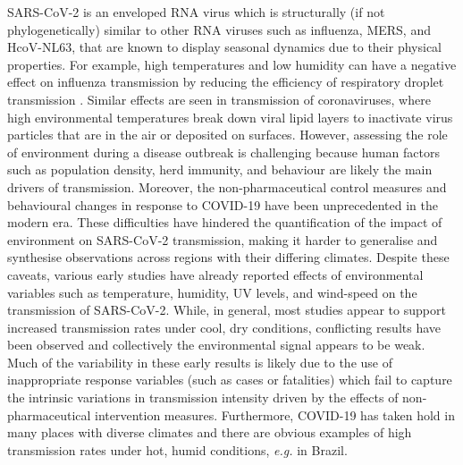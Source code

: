 \documentclass[12pt,english,a4paper]{article}
\newcommand{\virus}{SARS-CoV-2\xspace}
\newcommand{\disease}{COVID-19\xspace}
\begin{document}
\virus is an enveloped RNA virus which is structurally (if not phylogenetically)
similar to other RNA viruses such as influenza, MERS, and HcoV-NL63\cite{Xie2020}, that are known to display seasonal dynamics due to their physical properties. For example, high temperatures and low humidity can have a negative effect on influenza transmission by reducing the efficiency of respiratory droplet transmission \cite{Lowen2007, Lowen2014}. Similar effects are seen in transmission of coronaviruses\cite{Tan2005, Chan2011, VanDoremalen2013}, where high environmental temperatures break down viral lipid layers to inactivate virus particles that are in the air or deposited on surfaces\cite{Chan2011,Schoeman2019}.
However, assessing the role of environment during a disease outbreak is challenging\cite{Carlson2020} because human factors such as population density, herd immunity, and behaviour are likely the main drivers of transmission\cite{Carlson2020a, Korevaar2020, Rocklov2020}. Moreover, the non-pharmaceutical control measures and behavioural changes in response to \disease have been unprecedented in the modern era.
These difficulties have hindered the quantification of the impact of environment on \virus transmission, making it harder to generalise and synthesise observations across regions with their differing climates.
Despite these caveats, various early studies have already reported effects of environmental variables such as temperature, humidity, UV levels, and wind-speed on the transmission of \virus \cite{Araujo2020, Baker2020, Bukhari2020, Chen2020, Luo2020, Ma2020, Merow2020, Sajadi2020}.
While, in general, most studies appear to support increased transmission rates under cool, dry conditions\cite{Baker2020},
conflicting results have been observed\cite{Luo2020, Yao2020} and collectively the environmental signal appears to be weak\cite{Smit2020}. 
Much of the variability in these early results is likely due to the use of inappropriate response variables (such as cases or fatalities) which fail to capture the intrinsic variations in transmission intensity driven by the effects of non-pharmaceutical intervention measures\cite{Smit2020}. Furthermore, \disease has taken hold in many places with diverse climates and there are obvious examples of high transmission rates under hot, humid conditions, \emph{e.g.} in Brazil\cite{Candido2020}.
\end{document}
